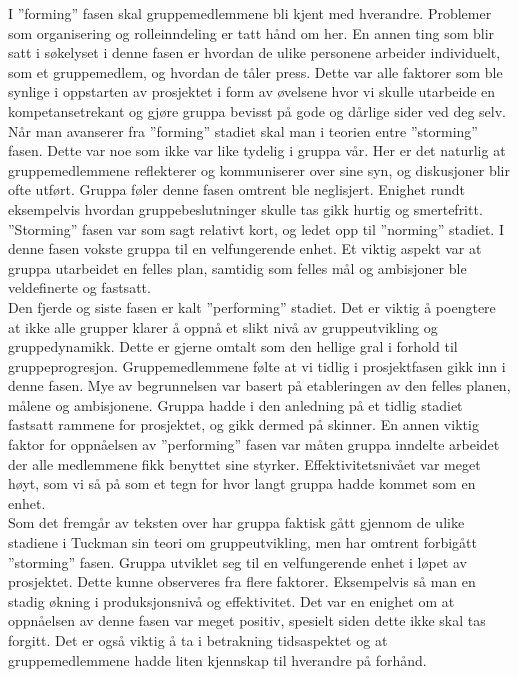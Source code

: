 I ''forming'' fasen skal gruppemedlemmene bli kjent med hverandre. Problemer som organisering og rolleinndeling er tatt hånd om her. En annen ting som blir satt i søkelyset i denne fasen er hvordan de ulike personene arbeider individuelt, som et gruppemedlem, og hvordan de tåler press. Dette var alle faktorer som ble synlige i oppstarten av prosjektet i form av øvelsene hvor vi skulle utarbeide en kompetansetrekant og gjøre gruppa bevisst på gode og dårlige sider ved deg selv.\\

Når man avanserer fra ''forming'' stadiet skal man i teorien entre ''storming'' fasen. Dette var noe som ikke var like tydelig i gruppa vår. Her er det naturlig at gruppemedlemmene reflekterer og kommuniserer over sine syn, og diskusjoner blir ofte utført. Gruppa føler denne fasen omtrent ble neglisjert. Enighet rundt eksempelvis hvordan gruppebeslutninger skulle tas gikk hurtig og smertefritt.\\

''Storming'' fasen var som sagt relativt kort, og ledet opp til ''norming'' stadiet. I denne fasen vokste gruppa til en velfungerende enhet. Et viktig aspekt var at gruppa utarbeidet en felles plan, samtidig som felles mål og ambisjoner ble veldefinerte og fastsatt.\\

Den fjerde og siste fasen er kalt ''performing'' stadiet. Det er viktig å poengtere at ikke alle grupper klarer å oppnå et slikt nivå av gruppeutvikling og gruppedynamikk. Dette er gjerne omtalt som den hellige gral i forhold til gruppeprogresjon. Gruppemedlemmene følte at vi tidlig i prosjektfasen gikk inn i denne fasen. Mye av begrunnelsen var basert på etableringen av den felles planen, målene og ambisjonene. Gruppa hadde i den anledning på et tidlig stadiet fastsatt rammene for prosjektet, og gikk dermed på skinner. En annen viktig faktor for oppnåelsen av ''performing'' fasen var måten gruppa inndelte arbeidet der alle medlemmene fikk benyttet sine styrker. Effektivitetsnivået var meget høyt, som vi så på som et tegn for hvor langt gruppa hadde kommet som en enhet.\\

Som det fremgår av teksten over har gruppa faktisk gått gjennom de ulike stadiene i Tuckman sin teori om gruppeutvikling, men har omtrent forbigått ''storming'' fasen. Gruppa utviklet seg til en velfungerende enhet i løpet av prosjektet. Dette kunne observeres fra flere faktorer. Eksempelvis så man en stadig økning i produksjonsnivå og effektivitet. Det var en enighet om at oppnåelsen av denne fasen var meget positiv, spesielt siden dette ikke skal tas forgitt. Det er også viktig å ta i betrakning tidsaspektet og at gruppemedlemmene hadde liten kjennskap til hverandre på forhånd.\\
